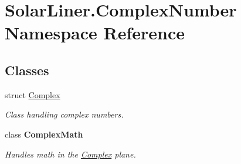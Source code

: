\hypertarget{namespace_solar_liner_1_1_complex_number}{}\section{Solar\+Liner.\+Complex\+Number Namespace Reference}
\label{namespace_solar_liner_1_1_complex_number}
\subsection*{Classes}
\begin{DoxyCompactItemize}
\item 
struct \hyperlink{struct_solar_liner_1_1_complex_number_1_1_complex}{Complex}
\begin{DoxyCompactList}\small\item\em Class handling complex numbers. \end{DoxyCompactList}\item 
class {\bfseries Complex\+Math}
\begin{DoxyCompactList}\small\item\em Handles math in the \hyperlink{struct_solar_liner_1_1_complex_number_1_1_complex}{Complex} plane. \end{DoxyCompactList}\end{DoxyCompactItemize}
